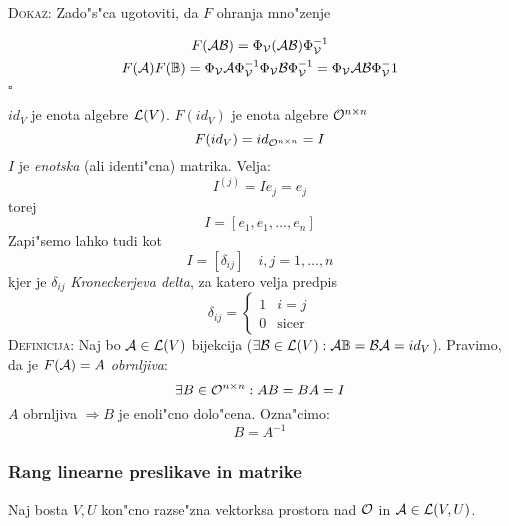 \textsc{Dokaz:} Zado"s"ca ugotoviti, da $F$ ohranja mno"zenje

\begin{gather*}
F(\mathcal{A} \mathcal{B}) = \Phi_{\mathcal{V}} (\mathcal{A} \mathcal{B}) \Phi_{\mathcal{V}}^{-1} \\
F(\mathcal{A}) F(\mathbb{B}) = \Phi_{\mathcal{V}} \mathcal{A} \Phi_{\mathcal{V}}^{-1} \Phi_{\mathcal{V}} \mathcal{B} \Phi_{\mathcal{V}}^{-1} = \Phi_{\mathcal{V}} \mathcal{A} \mathcal{B} \Phi_{\mathcal{V}}^-1
\end{gather*}
\hfill $\square$

$id_V$ je enota algebre $\mathcal{L}(V)$. $F(id_V)$ je enota algebre $\mathcal{O}^{n \times n}$
\begin{equation*}
F(id_V) = id_{\mathcal{O}^{n \times n}} = I
\end{equation*}
$I$ je \emph{enotska} (ali identi"cna) matrika. Velja:
\begin{equation*}
I^{(j)} = I e_j = e_j
\end{equation*}
torej 
\begin{equation*}
I = [e_1, e_1, \ldots, e_n]
\end{equation*}
Zapi"semo lahko tudi kot
\begin{equation*}
I = [\delta_{ij}]\quad i,j = 1, \ldots, n
\end{equation*}
kjer je $\delta_{ij}$ \emph{Kroneckerjeva delta}, za katero velja predpis
\begin{equation*}
\delta_{ij} = \begin{cases}
1 & i = j \\
0 & \text{sicer}
\end{cases}
\end{equation*}
%
\textsc{Definicija:} Naj bo $\mathcal{A} \in \mathcal{L}(V)$ bijekcija ($\exists \mathcal{B} \in \mathcal{L}(V): \mathcal{A} \mathbb{B} = \mathcal{B} \mathcal{A} = id_V$). Pravimo, da je $F(\mathcal{A}) = A$ \emph{obrnljiva}:
\begin{equation*}
\exists B \in \mathcal{O}^{n \times n} : A B = BA = I
\end{equation*}
$A$ obrnljiva $\Rightarrow B$ je enoli"cno dolo"cena. Ozna"cimo:
\begin{equation*}
B = A^{-1}
\end{equation*}
\subsubsection{Rang linearne preslikave in matrike}
Naj bosta $V, U$ kon"cno razse"zna vektorksa prostora nad $\mathcal{O}$ in $\mathcal{A} \in \mathcal{L}(V, U)$.

